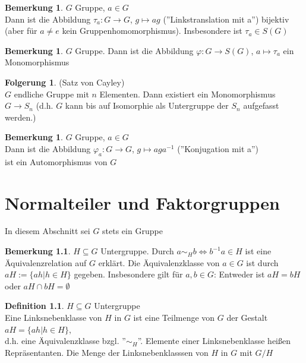 \documentclass[10pt,a4paper,numbers=endperiod]{scrreprt}
\theoremstyle{definition}
\newtheorem{defi}[satz]{Definition}
\newtheorem{bem}[satz]{Bemerkung}
\newtheorem{folg}[satz]{Folgerung}
\begin{document}
\begin{bem}
	$G$ Gruppe, $a \in G$\\
	Dann ist die Abbildung $\tau_a: G \rightarrow G$, $g \mapsto ag$ (''Linkstranslation mit a'') bijektiv (aber für $a \neq e$ kein Gruppenhomomorphismus). Insbesondere ist $\tau_a \in S(G)$ 
\end{bem}

\begin{bem}
	$G$ Gruppe. Dann ist die Abbildung $\varphi: G \rightarrow S(G)$, $a \mapsto \tau_a$ ein Monomorphismus
\end{bem}

\begin{folg}
	(Satz von Cayley)\\
	$G$ endliche Gruppe mit $n$ Elementen. Dann existiert ein Monomorphismus $G \rightarrow S_n$ (d.h. $G$ kann bis auf Isomorphie als Untergruppe der $S_n$ aufgefasst werden.) 
\end{folg}

\begin{bem}
	$G$ Gruppe, $a \in G$\\
	Dann ist die Abbildung $\varphi_a: G \rightarrow G$, $g \mapsto a g a^{-1}$ (''Konjugation mit a'')\\
	ist ein Automorphismus von $G$
\end{bem}

\chapter{Normalteiler und Faktorgruppen} $ $\\

In diesem Abschnitt sei $G$ stets ein Gruppe\\

\begin{bem}
	$H \subseteq G$ Untergruppe. Durch $a \sim_H b \Leftrightarrow b^{-1} a \in H$ ist eine Äquivalenzrelation auf $G$ erklärt. Die Äquivalenzklasse von $a \in G$ ist durch $aH:= \{ah| h \in H\}$ gegeben. Insbesondere gilt für $a,b \in G$: Entweder ist $aH = bH$ oder $aH \cap bH = \emptyset$
\end{bem}

\begin{defi}
	$H \subseteq G$ Untergruppe\\
	Eine Linksnebenklasse von $H$ in $G$ ist eine Teilmenge von $G$ der Gestalt $aH = \{ah|h \in H\}$,\\
	d.h. eine Äquivalenzklasse bzgl. ''$\sim_H$''. Elemente einer Linksnebenklasse heißen Repräsentanten. Die Menge der Linksnebenklasssen von $H$ in $G$ mit $G/H$
\end{defi}
\end{document}
